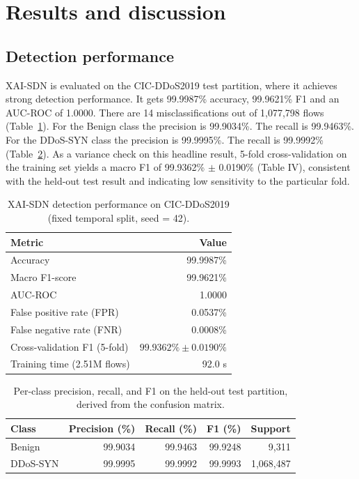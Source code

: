 \documentclass{ieeeaccess}
\begin{document}
\section{Results and discussion}
\label{sec:results}

\subsection{Detection performance}
XAI-SDN is evaluated on the CIC-DDoS2019 test partition, where it achieves strong detection performance. It gets 99.9987\% accuracy, 99.9621\% F1 and an AUC-ROC of 1.0000. There are 14 misclassifications out of 1,077,798 flows (Table~\ref{tab:results}). For the Benign class the precision is 99.9034\%. The recall is 99.9463\%. For the DDoS-SYN class the precision is 99.9995\%. The recall is 99.9992\% (Table~\ref{tab:perclass}). As a variance check on this headline result, 5-fold cross-validation on the training set yields a macro F1 of 99.9362\% $\pm$ 0.0190\% (Table IV), consistent with the held-out test result and indicating low sensitivity to the particular fold.

\begin{table}
\caption{XAI-SDN detection performance on CIC-DDoS2019 (fixed temporal split, seed = 42).}
\centering
\label{tab:results}
\small
\setlength{\tabcolsep}{6pt}
\renewcommand{\arraystretch}{1.25}
\begin{tabular}{@{}lr@{}}
\toprule
\textbf{Metric} & \textbf{Value} \\
\midrule
Accuracy & 99.9987\% \\
Macro F1-score & 99.9621\% \\
AUC-ROC & 1.0000 \\
False positive rate (FPR) & 0.0537\% \\
False negative rate (FNR) & 0.0008\% \\
Cross-validation F1 (5-fold) & $99.9362\% \pm 0.0190\%$ \\
Training time (2.51M flows) & 92.0 s \\
\bottomrule
\end{tabular}
\end{table}

\begin{table}
\caption{Per-class precision, recall, and F1 on the held-out test partition, derived from the confusion matrix.}
\centering
\label{tab:perclass}
\small
\setlength{\tabcolsep}{4pt}
\begin{tabular}{@{}lrrrr@{}}
\toprule
\textbf{Class} & \textbf{Precision (\%)} & \textbf{Recall (\%)} & \textbf{F1 (\%)} & \textbf{Support} \\
\midrule
Benign & 99.9034 & 99.9463 & 99.9248 & 9,311 \\
DDoS-SYN & 99.9995 & 99.9992 & 99.9993 & 1,068,487 \\
\bottomrule
\end{tabular}
\end{table}
\end{document}
